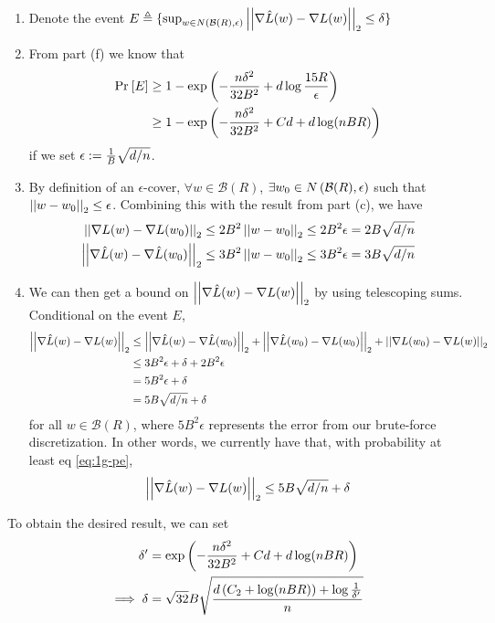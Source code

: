\documentclass[11pt]{article}
\newcommand{\1}{\mathbb{I}} %
\begin{document}
\begin{enumerate}
	\item Denote the event $E \triangleq \{ \sup_{w \in N\left(  \mathcal B(R), \epsilon \right)} \left|\left| \nabla \hat L(w) - \nabla L(w) \right|\right|_{2} \leq \delta \} $
	
	\item From part (f) we know that 
	\begin{align}
		\text{Pr}_{}\left[E\right] &\geq 1 -  \exp\left(   - \frac{ n \delta^2}{ 32B^2 }    + d\log \frac{15R}{\epsilon} \right) \\
		&\geq 1 - \exp\left(   - \frac{ n \delta^2}{ 32B^2 }    + Cd + d \log (nBR)  \right) \label{eq:1g-pe}
	\end{align}
	if we set $\epsilon := \frac{1}{B} \sqrt{d/n}$. 
	
	\item By definition of an $\epsilon$-cover, $\forall w \in \mathcal B(R)$, $\exists w_0 \in N\left(  \mathcal B(R), \epsilon \right)$ such that $\left|\left| w - w_0 \right|\right|_{2} \leq \epsilon$. Combining this with the result from part (c), we have
	\begin{align}
		\left|\left| \nabla L(w) - \nabla L(w_0) \right|\right|_{2} 
			&\leq 2 B^2 \left|\left| w - w_0 \right|\right|_{2} \leq 2 B^2 \epsilon = 2B\sqrt{d/n} \\
		\left|\left| \nabla \hat L(w) - \nabla \hat L(w_0) \right|\right|_{2}
			&\leq 3 B^2 \left|\left| w - w_0 \right|\right|_{2} \leq 3 B^2 \epsilon = 3B \sqrt{d/n}
	\end{align}

	\item We can then get a bound on $\left|\left| \nabla \hat L(w) - \nabla L(w) \right|\right|_{2}$ by using telescoping sums. Conditional on the event $E$, 
	\begin{align}
		\left|\left| \nabla \hat L(w) - \nabla L(w) \right|\right|_{2} 
			&\leq \left|\left| \nabla \hat L(w) - \nabla \hat L(w_0) \right|\right|_{2}
				+ \left|\left| \nabla \hat L(w_0) - \nabla L(w_0) \right|\right|_{2}
				+ \left|\left| \nabla L(w_0) - \nabla L(w) \right|\right|_{2} \\
			& \leq 3B^2 \epsilon + \delta + 2 B^2 \epsilon \\
			&= 5 B^2 \epsilon + \delta \\
			&= 5 B \sqrt{d/n} + \delta  
	\end{align}
	for all $w \in \mathcal B(R)$, where $5B^2 \epsilon$ represents the error from our brute-force discretization. In other words, we currently have that, with probability at least eq \ref{eq:1g-pe}, 
	\begin{align}
		\left|\left| \nabla \hat L(w) - \nabla L(w) \right|\right|_{2} \leq 5 B \sqrt{d/n} + \delta  
	\end{align}

\end{enumerate}

To obtain the desired result, we can set 
\begin{align}
	\delta' 
		&= \exp\left(   - \frac{ n \delta^2}{ 32B^2 }    + Cd + d \log (nBR)  \right) \\
	\implies \delta 
		&= \sqrt{32}B \sqrt{
			\dfrac{d \left( C_2 + \log(nBR) \right) + \log\frac{1}{\delta'}}{n}
		}
\end{align}
\end{document}
